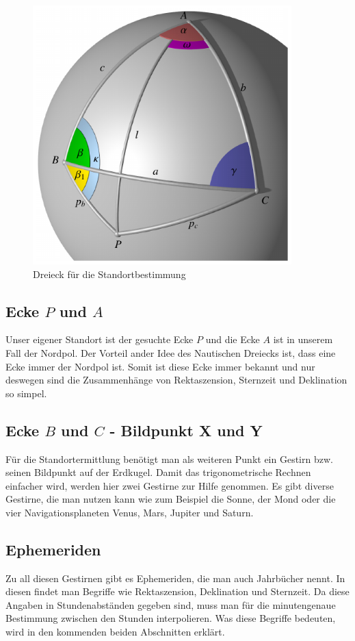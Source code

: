 \begin{figure}
	\begin{center}
		\includegraphics[width=10cm]{papers/nav/bilder/dreieck.pdf}
		\caption[Dreieck für die Standortbestimmung]{Dreieck für die Standortbestimmung}
	\end{center}
\end{figure}




\subsection{Ecke $P$ und $A$}
Unser eigener Standort ist der gesuchte Ecke $P$ und die Ecke $A$ ist in unserem Fall der Nordpol.
Der Vorteil ander Idee des Nautischen Dreiecks ist, dass eine Ecke immer der Nordpol ist. 
Somit ist diese Ecke immer bekannt und nur deswegen sind die Zusammenhänge von Rektaszension, Sternzeit und Deklination so simpel.

\subsection{Ecke $B$ und $C$ - Bildpunkt X und Y}
Für die Standortermittlung benötigt man als weiteren Punkt ein Gestirn bzw. seinen Bildpunkt auf der Erdkugel. 
Damit das trigonometrische Rechnen einfacher wird, werden hier zwei Gestirne zur Hilfe genommen.
Es gibt diverse Gestirne, die man nutzen kann wie zum Beispiel die Sonne, der Mond oder die vier Navigationsplaneten Venus, Mars, Jupiter und Saturn.

\subsection{Ephemeriden}
Zu all diesen Gestirnen gibt es Ephemeriden, die man auch Jahrbücher nennt. 
In diesen findet man Begriffe wie Rektaszension, Deklination und Sternzeit.
Da diese Angaben in Stundenabständen gegeben sind, muss man für die minutengenaue Bestimmung zwischen den Stunden interpolieren.
Was diese Begriffe bedeuten, wird in den kommenden beiden Abschnitten erklärt.

